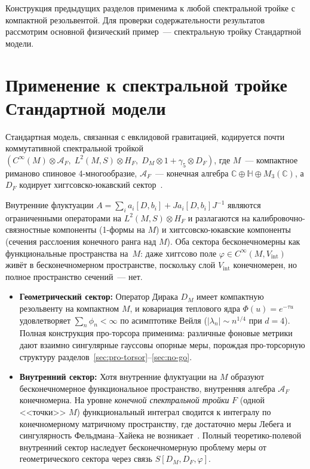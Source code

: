 \documentclass[12pt,a4paper]{article}
\theoremstyle{plain}
\theoremstyle{definition}
\theoremstyle{remark}
\begin{document}
Конструкция предыдущих разделов применима к любой спектральной тройке
с компактной резольвентой.  Для проверки содержательности результатов
рассмотрим основной физический пример~--- спектральную тройку
Стандартной модели.

\section{Применение к спектральной тройке Стандартной модели}
\label{sec:SM}

Стандартная модель, связанная с евклидовой гравитацией, кодируется
почти коммутативной спектральной тройкой
$(C^\infty(M) \otimes \mathcal{A}_F,\; L^2(M,S) \otimes H_F,\;
D_M \otimes 1 + \gamma_5 \otimes D_F)$, где $M$~--- компактное
риманово спиновое 4-многообразие, $\mathcal{A}_F$~--- конечная алгебра
$\mathbb{C} \oplus \mathbb{H} \oplus M_3(\mathbb{C})$, а $D_F$
кодирует хиггсовско-юкавский сектор~\cite{CCM:2007,vS:2015}.

Внутренние флуктуации $A = \sum_i a_i[D,b_i] + J a_i[D,b_i] J^{-1}$
являются ограниченными операторами на $L^2(M,S) \otimes H_F$ и
разлагаются на калибровочно-связностные компоненты (1-формы на $M$) и
хиггсовско-юкавские компоненты (сечения расслоения конечного ранга
над $M$).  Оба сектора бесконечномерны как функциональные
пространства на~$M$: даже хиггсово поле
$\varphi \in C^\infty(M, V_{\mathrm{int}})$ живёт в
бесконечномерном пространстве, поскольку слой $V_{\mathrm{int}}$
конечномерен, но полное пространство сечений~--- нет.

\begin{itemize}[leftmargin=2em]
  \item \textbf{Геометрический сектор:}
    Оператор Дирака $D_M$ имеет компактную резольвенту на компактном $M$,
    и ковариация теплового ядра $\Phi(u) = e^{-\tau u}$ удовлетворяет
    $\sum_n \phi_n < \infty$ по асимптотике Вейля
    ($|\lambda_n| \sim n^{1/4}$ при $d=4$).  Полная конструкция
    про-торсора применима: различные фоновые метрики дают взаимно
    сингулярные гауссовы опорные меры, порождая про-торсорную структуру
    разделов~\ref{sec:pro-torsor}--\ref{sec:no-go}.

  \item \textbf{Внутренний сектор:}
    Хотя внутренние флуктуации на $M$ образуют бесконечномерное
    функциональное пространство, внутренняя алгебра
    $\mathcal{A}_F$ конечномерна.  На уровне
    \emph{конечной спектральной тройки} $F$ (одной <<точки>> $M$)
    функциональный интеграл сводится к интегралу по конечномерному
    матричному пространству, где достаточно меры Лебега и сингулярность
    Фельдмана--Хайека не возникает~\cite{BarrettGlaser:2016}.
    Полный теоретико-полевой внутренний сектор наследует
    бесконечномерную проблему меры от геометрического сектора
    через связь $S[D_M, D_F, \varphi]$.
\end{itemize}
\end{document}
